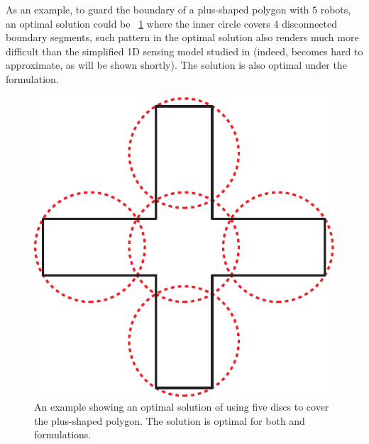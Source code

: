 As an example, to guard the boundary of a plus-shaped polygon with $5$ 
robots, an optimal solution could be ~\ref{fig:osg-example} where the 
inner circle covers $4$ disconnected boundary segments, such pattern 
in the optimal solution also renders \opgt much more difficult than 
the simplified 1D sensing model studied in \cite{fenghangaoyu2019efficient} 
(indeed, \opgt becomes hard to approximate, as will be shown shortly). 
The solution is also optimal under the \orgt formulation.
\begin{figure}[ht]
    \centering
		\vspace*{3mm}
    \includegraphics[scale=0.35]{chapters/osg/figures/exp_fig-e-eps-converted-to.pdf}
		\vspace*{1.5mm}
    \caption[An example showing an optimal solution of using five discs to cover the plus-shaped polygon]
    {An example showing an optimal solution of using five discs
		to cover the plus-shaped polygon. The solution is optimal for both 
		\opgt and \orgt formulations.}
    \label{fig:osg-example}
\end{figure}


